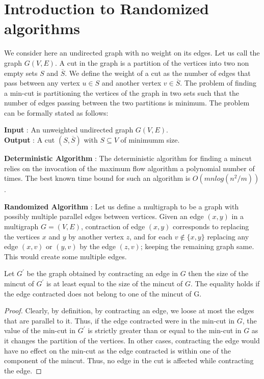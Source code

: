 

\section{Introduction to Randomized algorithms}
We consider here an undirected graph with no weight on its edges. Let us call the graph $G(V,E)$. A cut
in the graph is a partition of the vertices into two non empty sets $S$ and $\overline{S}$. We define 
the weight of a cut as the number of edges that pass between any vertex $u\in S$ and another vertex $v \in \overline{S}$.
The problem of finding a min-cut is partitioning the vertices of the graph in two sets such that the
number of edges passing between the two partitions is minimum. The problem can be formally stated as follows:
\begin{center}
\textbf{Input} : An unweighted undirected graph $G(V,E)$.\\
\textbf{Output} : A cut $(S,\overline{S})$ with $S \subseteq V$ of minimumm size. 
\end{center}

\noindent\textbf{Deterministic Algorithm} : The deterministic algorithm for finding a mincut relies
on the invocation of the maximum flow algorithm a polynomial number of times. The best known time
bound for such an algorithm is $O(mnlog(n^{2}/m))$.


\noindent\textbf{Randomized Algorithm} : Let us define a multigraph to be a graph with possibly multiple
parallel edges between vertices. Given an edge $(x,y)$ in a multigraph $G=(V,E)$, contraction of
edge $(x,y)$ corresponds to replacing the vertices $x$ and $y$ by another vertex $z$, and for each 
$v\notin \{x,y\}$ replacing any edge $(x,v)$ or $(y,v)$ by the edge $(z,v)$; keeping the remaining
graph same. This would create some multiple edges.\\

\begin{lemma}
 Let $G^{\prime}$ be the graph obtained by contracting an edge in $G$ then the size of the mincut of
$G^{\prime}$ is at least equal to the size of the mincut of $G$. The equality holds if the edge 
contracted does not belong to one of the mincut of G.
\end{lemma}
\begin{proof}
 Clearly, by definition, by contracting an edge, we loose at most the edges that are parallel to it. 
Thus, if the edge contracted were in the min-cut in $G$, the value of the min-cut in $G^{\prime}$ is strictly
greater than or equal to the min-cut in $G$ as it changes the partition of the vertices. In other cases, 
contracting the edge would have no effect on the min-cut as the edge contracted is within one of the 
component of the mincut. Thus, no edge in the cut is affected while contracting the edge.
\end{proof}

